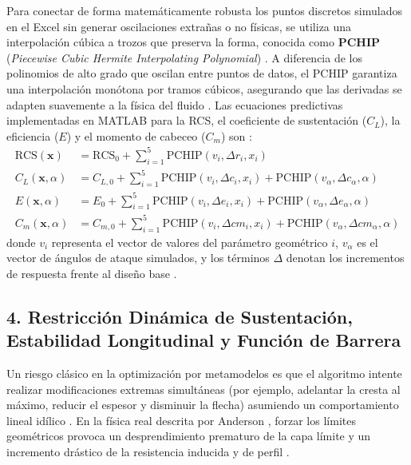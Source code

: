 \documentclass[11pt, a4paper]{article}
\begin{document}
Para conectar de forma matemáticamente robusta los puntos discretos simulados en el Excel sin generar oscilaciones extrañas o no físicas, se utiliza una interpolación cúbica a trozos que preserva la forma, conocida como \textbf{PCHIP} (\textit{Piecewise Cubic Hermite Interpolating Polynomial}) \cite{montgomery, anderson}. A diferencia de los polinomios de alto grado que oscilan entre puntos de datos, el PCHIP garantiza una interpolación monótona por tramos cúbicos, asegurando que las derivadas se adapten suavemente a la física del fluido \cite{montgomery, anderson}. Las ecuaciones predictivas implementadas en MATLAB para la RCS, el coeficiente de sustentación ($C_L$), la eficiencia ($E$) y el momento de cabeceo ($C_m$) son \cite{anderson}:
\begin{align}
    \text{RCS}(\mathbf{x}) &= \text{RCS}_0 + \sum_{i=1}^{5} \text{PCHIP}(v_i, \Delta r_i, x_i) \\
    C_L(\mathbf{x}, \alpha) &= C_{L,0} + \sum_{i=1}^{5} \text{PCHIP}(v_i, \Delta c_i, x_i) + \text{PCHIP}(v_{\alpha}, \Delta c_{\alpha}, \alpha) \\
    E(\mathbf{x}, \alpha) &= E_0 + \sum_{i=1}^{5} \text{PCHIP}(v_i, \Delta e_i, x_i) + \text{PCHIP}(v_{\alpha}, \Delta e_{\alpha}, \alpha) \\
    C_m(\mathbf{x}, \alpha) &= C_{m,0} + \sum_{i=1}^{5} \text{PCHIP}(v_i, \Delta cm_i, x_i) + \text{PCHIP}(v_{\alpha}, \Delta cm_{\alpha}, \alpha)
\end{align}
donde $v_i$ representa el vector de valores del parámetro geométrico $i$, $v_{\alpha}$ es el vector de ángulos de ataque simulados, y los términos $\Delta$ denotan los incrementos de respuesta frente al diseño base \cite{anderson}.

\subsection*{4. Restricción Dinámica de Sustentación, Estabilidad Longitudinal y Función de Barrera}
Un riesgo clásico en la optimización por metamodelos es que el algoritmo intente realizar modificaciones extremas simultáneas (por ejemplo, adelantar la cresta al máximo, reducir el espesor y disminuir la flecha) asumiendo un comportamiento lineal idílico \cite{anderson}. En la física real descrita por Anderson \cite{anderson}, forzar los límites geométricos provoca un desprendimiento prematuro de la capa límite y un incremento drástico de la resistencia inducida y de perfil \cite{anderson}.
\end{document}
